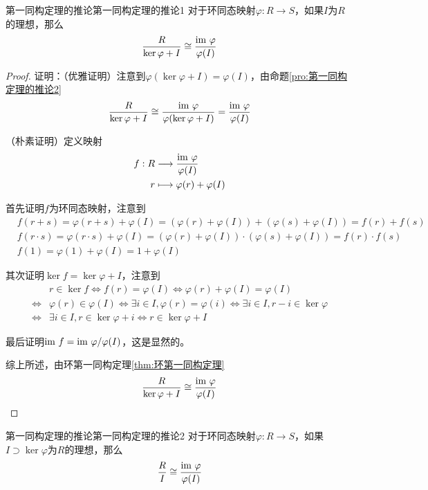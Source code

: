 \begin{proposition}{第一同构定理的推论}{第一同构定理的推论1}
	对于环同态映射$\varphi:R\to S$，如果$I$为$R$的理想，那么
	$$
	\frac{R}{\ker\varphi+I}\cong\frac{\text{im } \varphi}{\varphi(I)}
	$$
\end{proposition}

\begin{proof}
	
	证明：（优雅证明）注意到$\varphi(\ker\varphi+I)=\varphi(I)$，由命题\ref{pro:第一同构定理的推论2}
	$$
	\frac{R}{\ker\varphi+I}\cong\frac{\text{im } \varphi}{\varphi(\ker\varphi+I)}=\frac{\text{im } \varphi}{\varphi(I)}
	$$
	
	（朴素证明）定义映射
	\begin{align*}
		f:\begin{aligned}[t]
			R&\longrightarrow \frac{\text{im } \varphi}{\varphi(I)}\\
			r&\longmapsto \varphi(r)+\varphi(I)
		\end{aligned}
	\end{align*}
	
	首先证明$f$为环同态映射，注意到
	\begin{align*}
		&f(r+s)=\varphi(r+s)+\varphi(I)=(\varphi(r)+\varphi(I))+(\varphi(s)+\varphi(I))=f(r)+f(s)\\
		&f(r\cdot s)=\varphi(r\cdot s)+\varphi(I)=(\varphi(r)+\varphi(I))\cdot(\varphi(s)+\varphi(I))=f(r)\cdot f(s)\\
		&f(1)=\varphi(1)+\varphi(I)=1+\varphi(I)
	\end{align*}
	
	其次证明$\ker f=\ker\varphi+I$，注意到
	\begin{align*}
		&r\in\ker f
		\iff f(r)=\varphi(I)
		\iff \varphi(r)+\varphi(I)=\varphi(I)\\
		\iff &\varphi(r)\in\varphi(I)
		\iff \exists i\in I,\varphi(r)=\varphi(i)
		\iff \exists i\in I,r-i\in\ker\varphi\\
		\iff&\exists i\in I,r\in\ker\varphi+i
		\iff r\in\ker\varphi+I
	\end{align*}
	
	最后证明$\text{im } f=\text{im } \varphi/\varphi(I)$，这是显然的。
	
	综上所述，由环第一同构定理\ref{thm:环第一同构定理}
	$$
	\frac{R}{\ker\varphi+I}\cong\frac{\text{im } \varphi}{\varphi(I)}
	$$
\end{proof}

\begin{proposition}{第一同构定理的推论}{第一同构定理的推论2}
	对于环同态映射$\varphi:R\to S$，如果$I\supset\ker\varphi$为$R$的理想，那么
	$$
	\frac{R}{I}\cong\frac{\text{im } \varphi}{\varphi(I)}
	$$
\end{proposition}


